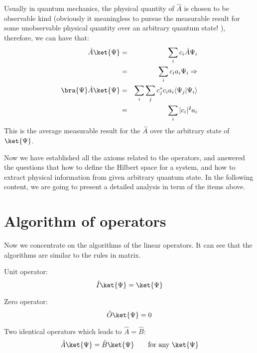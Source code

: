 Usually in quantum mechanics, the physical quantity of $\hat{A}$ is
chosen to be observable kind (obviously it meaningless to pursue the
measurable result for some unobservable physical quantity over an
arbitrary quantum state! ), therefore, we can have that:
\begin{eqnarray}\label{OPERATOReq:2}
  \hat{A}\ket{\Psi}
  &=& \sum_{i}c_{i}\hat{A}\Psi_{i} \nonumber \\
  &=& \sum_{i}c_{i}a_{i}\Psi_{i}  \Rightarrow \nonumber \\
  \bra{\Psi}\hat{A}\ket{\Psi}
  &=&
  \sum_{i}\sum_{j}c^{*}_{j}c_{i}a_{i}\langle\Psi_{j}|\Psi_{i}\rangle
  \nonumber \\
  &=& \sum_{i}|c_{i}|^{2}a_{i}
\end{eqnarray}
This is the average measurable result for the $\hat{A}$ over the
arbitrary state of $\ket{\Psi}$.

Now we have established all the axioms related to the operators, and
answered the questions that how to define the Hilbert space for a
system, and how to extract physical information from given arbitrary
quantum state. In the following content, we are going to present a
detailed analysis in term of the items above.



\section{Algorithm of operators}
%
Now we concentrate on the algorithms of the linear operators. It can
see that the algorithms are similar to the rules in matrix.

Unit operator:
\begin{equation}\label{}
\hat{I}\ket{\Psi} = \ket{\Psi}
\end{equation}

Zero operator:
\begin{equation}\label{}
\hat{O}\ket{\Psi} = 0
\end{equation}

Two identical operators which leads to $\hat{A}=\hat{B}$:
\begin{equation}\label{}
  \hat{A}\ket{\Psi} = \hat{B} \ket{\Psi} \qquad \text{for any $\ket{\Psi}$}
\end{equation}

